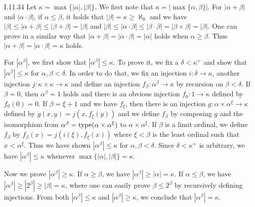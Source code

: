\documentclass[12pt]{article}
\begin{document}
\begin{customthm}{I.11.34}
  Let $\kappa=\max\{|\alpha|,|\beta|\}$. We first note that $\kappa=|\max\{\alpha,\beta\}|$. For $|\alpha+\beta|$ and $|\alpha\cdot\beta|$, if $\alpha\leq\beta$, it holds that $|\beta|=\kappa\geq\aleph_0$ and we have $|\beta|\leq|\alpha+\beta|\leq|\beta+\beta|=|\beta|$ and $|\beta|\leq|\alpha\cdot\beta|\leq|\beta\cdot\beta|=|\beta\times\beta|=|\beta|$. One can prove in a similar way that $|\alpha+\beta|=|\alpha\cdot\beta|=|\alpha|$ holds when $\alpha\geq\beta$. Thus $|\alpha+\beta|=|\alpha\cdot\beta|=\kappa$ holds.

  For $|\alpha^\beta|$, we first show that $|\alpha^\beta|\leq\kappa$. To prove it, we fix a $\delta<\kappa^+$ and show that $|\alpha^\beta|\leq\kappa$ for $\alpha,\beta<\delta$. In order to do that, we fix an injection $i:\delta\rightarrow\kappa$, another injection $j:\kappa\times\kappa\rightarrow\kappa$ and define an injection $f_\beta:\alpha^\beta\rightarrow\kappa$ by recursion on $\beta<\delta$. If $\beta=0$, then $\alpha^\beta=1$ holds and there is an obvious injection $f_0:1\rightarrow\kappa$ defined by $f_0(0)=0$. If $\beta=\xi+1$ and we have $f_\xi$, then there is an injection $g:\alpha\times\alpha^\xi\rightarrow\kappa$ defined by $g(x,y)=j(x,f_\xi(y))$ and we define $f_\beta$ by composing $g$ and the isomorphism from $\alpha^\beta=\mathop{\mathrm{type}}(\alpha\times\alpha^\xi)$ to $\alpha\times\alpha^\xi$. If $\beta$ is a limit ordinal, we define $f_\beta$ by $f_\beta(x)=j(i(\xi),f_\xi(x))$ where $\xi<\beta$ is the least ordinal such that $x<\alpha^\xi$. Thus we have shown $|\alpha^\beta|\leq\kappa$ for $\alpha,\beta<\delta$. Since $\delta<\kappa^+$ is arbitrary, we have $|\alpha^\beta|\leq\kappa$ whenever $\max\{|\alpha|,|\beta|\}=\kappa$.

  Now we prove $|\alpha^\beta|\geq\kappa$. If $\alpha\geq\beta$, we have $|\alpha^\beta|\geq|\alpha|=\kappa$. If $\alpha\leq\beta$, we have $|\alpha^\beta|\geq|2^\beta|\geq|\beta|=\kappa$, where one can easily prove $\beta\leq2^\beta$ by recursively defining injections. From both $|\alpha^\beta|\leq\kappa$ and $|\alpha^\beta|\geq\kappa$, we conclude that $|\alpha^\beta|=\kappa$.
\end{customthm}
\end{document}
